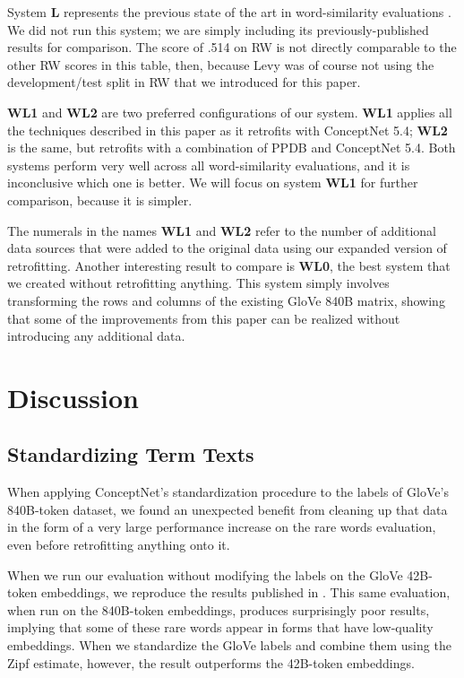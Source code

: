 \documentclass[letterpaper]{article}
\begin{document}
System {\bf L} represents the previous state of the
art in word-similarity evaluations \cite{levy2015embeddings}. We did not run this
system; we are simply including its previously-published results for comparison.
The score of .514 on RW is not directly comparable to the other RW scores in
this table, then, because Levy was of course not using the development/test
split in RW that we introduced for this paper.

{\bf WL1} and {\bf WL2} are two preferred configurations of our system. {\bf WL1}
applies all the techniques described in this paper as it retrofits with
ConceptNet 5.4; {\bf WL2} is the same, but retrofits with a combination of PPDB and
ConceptNet 5.4. Both systems perform very well across all word-similarity
evaluations, and it is inconclusive which one is better. We will focus on
system {\bf WL1} for further comparison, because it is simpler.

The numerals in the names {\bf WL1} and {\bf WL2} refer to the number of
additional data sources that were added to the original data using our expanded
version of retrofitting. Another interesting result to compare is {\bf WL0},
the best system that we created without retrofitting anything. This system
simply involves transforming the rows and columns of the existing GloVe 840B
matrix, showing that some of the improvements from this paper can be realized
without introducing any additional data.

\section{Discussion}

\subsection{Standardizing Term Texts}

When applying ConceptNet's standardization procedure to the labels of GloVe's
840B-token dataset, we found an unexpected benefit from cleaning up that data in
the form of a very large performance increase on the rare words evaluation,
even before retrofitting anything onto it.

When we run our evaluation without modifying the labels on the GloVe 42B-token
embeddings, we reproduce the results published in \cite{pennington2014glove}.
This same evaluation, when run on the 840B-token embeddings, produces
surprisingly poor results, implying that some of these rare words appear in
forms that have low-quality embeddings. When we standardize the GloVe labels and
combine them using the Zipf estimate, however, the result outperforms the
42B-token embeddings.
\end{document}
